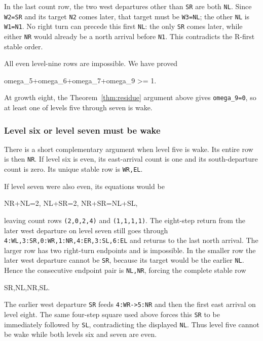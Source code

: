 \documentclass[11pt,letterpaper]{article}
\theoremstyle{plain}
\theoremstyle{definition}
\begin{document}
\begin{NoHyper}
In the last count row, the two west departures other than \texttt{SR} are both \texttt{NL}. Since \texttt{W2=SR} and its target \texttt{N2} comes later, that target must be \texttt{W3=NL}; the other \texttt{NL} is \texttt{W1=N1}. No right turn can precede this first \texttt{NL}: the only \texttt{SR} comes later, while either \texttt{NR} would already be a north arrival before \texttt{N1}. This contradicts the R-first stable order.

All even level-nine rows are impossible. We have proved

\begin{codeblock}
omega_5+omega_6+omega_7+omega_9 >= 1.
\end{codeblock}

At growth eight, the Theorem~\ref{thm:residue} argument above gives \texttt{omega\_9=0}, so at least one of levels five through seven is wake.

\subsubsection{Level six or level seven must be wake}

There is a short complementary argument when level five is wake. Its entire row is then \texttt{NR}. If level six is even, its east-arrival count is one and its south-departure count is zero. Its unique stable row is \texttt{WR,EL}.

If level seven were also even, its equations would be

\begin{codeblock}
NR+NL=2,       NL+SR=2,       NR+SR=NL+SL,
\end{codeblock}

leaving count rows \texttt{(2,0,2,4)} and \texttt{(1,1,1,1)}. The eight-step return from the later west departure on level seven still goes through \texttt{4:WL,3:SR,0:WR,1:NR,4:ER,3:SL,6:EL} and returns to the last north arrival. The larger row has two right-turn endpoints and is impossible. In the smaller row the later west departure cannot be \texttt{SR}, because its target would be the earlier \texttt{NL}. Hence the consecutive endpoint pair is \texttt{NL,NR}, forcing the complete stable row

\begin{codeblock}
SR,NL,NR,SL.
\end{codeblock}

The earlier west departure \texttt{SR} feeds \texttt{4:WR-\textgreater{}5:NR} and then the first east arrival on level eight. The same four-step square used above forces this \texttt{SR} to be immediately followed by \texttt{SL}, contradicting the displayed \texttt{NL}. Thus level five cannot be wake while both levels six and seven are even.


\end{NoHyper}
\end{document}
